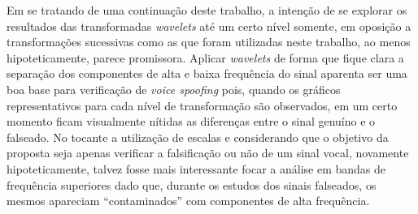     \par Em se tratando de uma continuação deste trabalho, a intenção de se explorar os resultados das transformadas \textit{wavelets} até um certo nível somente, em oposição a transformações sucessivas como as que foram utilizadas neste trabalho, ao menos hipoteticamente, parece promissora. Aplicar \textit{wavelets} de forma que fique clara a separação dos componentes de alta e baixa frequência do sinal aparenta ser uma boa base para verificação de \textit{voice spoofing} pois, quando os gráficos representativos para cada nível de transformação são observados, em um certo momento ficam visualmente nítidas as diferenças entre o sinal genuíno e o falseado. No tocante a utilização de escalas e considerando que o objetivo da proposta seja apenas verificar a falsificação ou não de um sinal vocal, novamente hipoteticamente, talvez fosse mais interessante focar a análise em bandas de frequência superiores dado que, durante os estudos dos sinais falseados, os mesmos apareciam 
   ``contaminados'' com componentes de alta frequência.